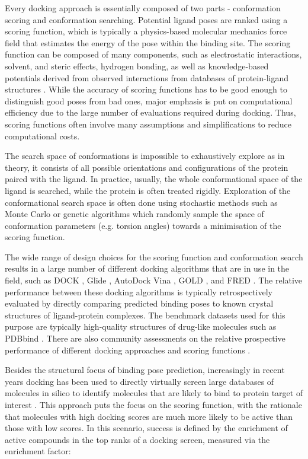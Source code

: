 Every docking approach is essentially composed of two parts - conformation scoring and conformation searching. Potential ligand poses are ranked using a scoring function, which is typically a physics-based molecular mechanics force field that estimates the energy of the pose within the binding site. The scoring function can be composed of many components, such as electrostatic interactions, solvent, and steric effects, hydrogen bonding, as well as knowledge-based potentials derived from observed interactions from databases of protein-ligand structures \cite{Li2019scoring}. While the accuracy of scoring functions has to be good enough to distinguish good poses from bad ones, major emphasis is put on computational efficiency due to the large number of evaluations required during docking. Thus, scoring functions often involve many assumptions and simplifications to reduce computational costs.

The search space of conformations is impossible to exhaustively explore as in theory, it consists of all possible orientations and configurations of the protein paired with the ligand. In practice, usually, the whole conformational space of the ligand is searched, while the protein is often treated rigidly. Exploration of the conformational search space is often done using stochastic methods such as Monte Carlo or genetic algorithms which randomly sample the space of conformation parameters (e.g. torsion angles) towards a minimisation of the scoring function.

The wide range of design choices for the scoring function and conformation search results in a large number of different docking algorithms that are in use in the field, such as DOCK \cite{Coleman2013DOCK}, Glide \cite{friesner2004glide}, AutoDock Vina \cite{Eberhardt2021Vina}, GOLD \cite{Verdonk2003Gold}, and FRED \cite{McGann2012FRED}. The relative performance between these docking algorithms is typically retrospectively evaluated by directly comparing predicted binding poses to known crystal structures of ligand-protein complexes. The benchmark datasets used for this purpose are typically high-quality structures of drug-like molecules such as PDBbind \cite{Wang2004PDBbind, Liu2014PDBbind}. There are also community assessments on the relative prospective performance of different docking approaches \cite{Parks2020D3R} and scoring functions \cite{Su2019CASF}.

Besides the structural focus of binding pose prediction, increasingly in recent years docking has been used to directly virtually screen large databases of molecules in silico to identify molecules that are likely to bind to protein target of interest \cite{Bender2021LargeScaleDocking}. This approach puts the focus on the scoring function, with the rationale that molecules with high docking scores are much more likely to be active than those with low scores. In this scenario, success is defined by the enrichment of active compounds in the top ranks of a docking screen, measured via the enrichment factor:

